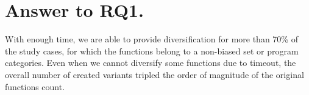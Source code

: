 \section{Answer to RQ1.}

With enough time, we are able to provide diversification for more than 70\% of the study cases, for which the functions belong to a non-biased set or program categories. Even when we cannot diversify some functions due to timeout, the overall  number of created variants tripled the order of magnitude of the original functions count. 


\begin{comment}

While our work is very limited by the provided corpora, it can be easily extended to other\dots

An application that benefits from the ablity of CROW is the large amount of generated variants. 


- CHeckLong questions for 80%
- Stress how to do experiments in Software Engineering, the theory behind how to do this in CS.
- The objects of the experiments are programs that ... 
- Motivate the corpora selection, size, can be ported, security sensitive, etc,
- Do not mention CROW in the selection criteria.
- The motivation is not related to tools, only to concepts
- Move paragraph after listing of coprpora to before.
- 


\end{comment}